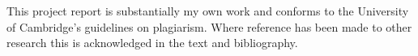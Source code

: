 \begin{declaration}
This project report is substantially my own work and conforms to the
University of Cambridge's guidelines on plagiarism. Where reference has been
made to other research this is acknowledged in the text and bibliography.
\end{declaration}
